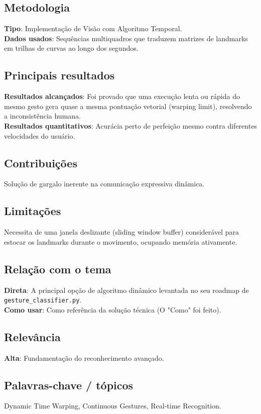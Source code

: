 \documentclass[12pt, a4paper]{article}
\begin{document}
\subsection{Metodologia}
\textbf{Tipo}: Implementação de Visão com Algoritmo Temporal.\\
\textbf{Dados usados}: Sequências multiquadros que traduzem matrizes de landmarks em trilhas de curvas ao longo dos segundos.\\
\subsection{Principais resultados}
\textbf{Resultados alcançados}: Foi provado que uma execução lenta ou rápida do mesmo gesto gera quase a mesma pontuação vetorial (warping limit), resolvendo a inconsistência humana.\\
\textbf{Resultados quantitativos}: Acurácia perto de perfeição mesmo contra diferentes velocidades do usuário.\\
\subsection{Contribuições}
Solução de gargalo inerente na comunicação expressiva dinâmica.\\
\subsection{Limitações}
Necessita de uma janela deslizante (sliding window buffer) considerável para estocar os landmarks durante o movimento, ocupando memória ativamente.\\
\subsection{Relação com o tema}
\textbf{Direta}: A principal opção de algoritmo dinâmico levantada no seu roadmap de \texttt{gesture\_classifier.py}.\\
\textbf{Como usar}: Como referência da solução técnica (O "Como" foi feito).\\
\subsection{Relevância}
\textbf{Alta}: Fundamentação do reconhecimento avançado.\\
\subsection{Palavras-chave / tópicos}
Dynamic Time Warping, Continuous Gestures, Real-time Recognition.\\
\end{document}
